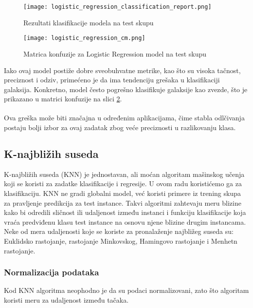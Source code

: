 \documentclass[a4paper,12pt]{article}
\begin{document}
\begin{figure}[H]
\centering
\texttt{[image: logistic\_regression\_classification\_report.png]}
\caption{Rezultati klasifikacije modela na test skupu}
\label{fig:logistic_regression_classification_report}
\end{figure}

\begin{figure}[H]
\centering
\texttt{[image: logistic\_regression\_cm.png]}
\caption{Matrica konfuzije za Logistic Regression model na test skupu}
\label{fig:logistic_regression_cm}
\end{figure}

Iako ovaj model postiže dobre sveobuhvatne metrike, kao što su visoka tačnost, preciznost i odziv, primećeno je da ima tendenciju grešaka u klasifikaciji galaksija. Konkretno, model često pogrešno klasifikuje galaksije kao zvezde, što je prikazano u matrici konfuzije na slici \ref{fig:logistic_regression_cm}.\\\\
Ova greška može biti značajna u određenim aplikacijama, čime stabla odlčivanja postaju bolji izbor za ovaj zadatak zbog veće preciznosti u razlikovanju klasa.

\subsection{K-najbližih suseda}

K-najbližih suseda (KNN) je jednostavan, ali moćan algoritam mašinskog učenja koji se koristi za zadatke klasifikacije i regresije. U ovom radu koristićemo ga za klasifikaciju. KNN ne gradi globalni model, već koristi primere iz trening skupa za pravljenje predikcija za test instance. Takvi algoritmi zahtevaju meru blizine kako bi odredili sličnost ili udaljenost između instanci i funkciju klasifikacije koja vraća predviđenu klasu test instance na osnovu njene blizine drugim instancama. Neke od mera udaljenosti koje se koriste za pronalaženje najbližeg suseda su: Euklidsko rastojanje, rastojanje Minkovskog, Hamingovo rastojanje i Menhetn rastojanje.

\subsubsection{Normalizacija podataka}
Kod KNN algoritma neophodno je da su podaci normalizovani, zato što algoritam koristi meru za udaljenost između tačaka.
\end{document}
